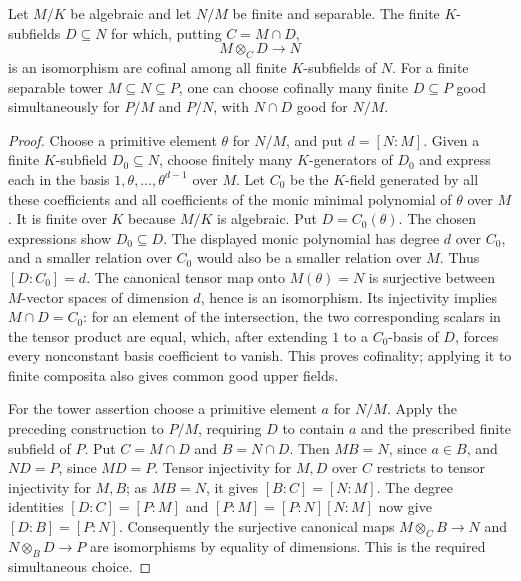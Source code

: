 \begin{lemma}
\label{fw:cofinal-finite-tensor-descent}
\leanok
Let $M/K$ be algebraic and let $N/M$ be finite and separable.
The finite $K$-subfields $D\subseteq N$ for which, putting $C=M\cap D$,
\[
 M\otimes_C D\longrightarrow N
\]
is an isomorphism are cofinal among all finite $K$-subfields of $N$.
For a finite separable tower $M\subseteq N\subseteq P$, one can choose
cofinally many finite $D\subseteq P$ good simultaneously for $P/M$
and $P/N$, with $N\cap D$ good for $N/M$.
\end{lemma}
\begin{proof}
Choose a primitive element $\theta$ for $N/M$, and put $d=[N:M]$.
Given a finite $K$-subfield $D_0\subseteq N$, choose finitely many
$K$-generators of $D_0$ and express each in the basis
$1,\theta,\ldots,\theta^{d-1}$ over $M$.
Let $C_0$ be the $K$-field generated by all these coefficients and all
coefficients of the monic minimal polynomial of $\theta$ over $M$.
It is finite over $K$ because $M/K$ is algebraic. Put $D=C_0(\theta)$.
The chosen expressions show $D_0\subseteq D$.
The displayed monic polynomial has degree $d$ over $C_0$, and a smaller
relation over $C_0$ would also be a smaller relation over $M$.
Thus $[D:C_0]=d$. The canonical tensor map onto $M(\theta)=N$
is surjective between $M$-vector spaces of dimension $d$, hence is an
isomorphism. Its injectivity implies $M\cap D=C_0$: for an element
of the intersection, the two corresponding scalars in the tensor
product are equal, which, after extending $1$ to a $C_0$-basis of $D$,
forces every nonconstant basis coefficient to vanish.
This proves cofinality; applying it to finite composita also gives
common good upper fields.

For the tower assertion choose a primitive element $a$ for $N/M$.
Apply the preceding construction to $P/M$, requiring $D$ to contain
$a$ and the prescribed finite subfield of $P$.
Put $C=M\cap D$ and $B=N\cap D$. Then $MB=N$, since $a\in B$,
and $ND=P$, since $MD=P$. Tensor injectivity for $M,D$ over $C$
restricts to tensor injectivity for $M,B$; as $MB=N$, it gives
$[B:C]=[N:M]$. The degree identities
$[D:C]=[P:M]$ and $[P:M]=[P:N][N:M]$ now give
$[D:B]=[P:N]$. Consequently the surjective canonical maps
$M\otimes_C B\to N$ and $N\otimes_B D\to P$ are isomorphisms by
equality of dimensions. This is the required simultaneous choice.
\end{proof}

